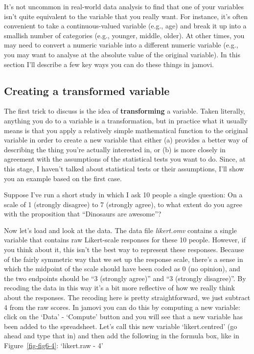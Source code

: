 \documentclass[
  a4paper,
]{book}
\begin{document}
It's not uncommon in real-world data analysis to find that one of your
variables isn't quite equivalent to the variable that you really want.
For instance, it's often convenient to take a continuous-valued variable
(e.g., age) and break it up into a smallish number of categories (e.g.,
younger, middle, older). At other times, you may need to convert a
numeric variable into a different numeric variable (e.g., you may want
to analyse at the absolute value of the original variable). In this
section I'll describe a few key ways you can do these things in jamovi.

\hypertarget{creating-a-transformed-variable}{%
\subsection{Creating a transformed
variable}\label{creating-a-transformed-variable}}

The first trick to discuss is the idea of \textbf{transforming} a
variable. Taken literally, anything you do to a variable is a
transformation, but in practice what it usually means is that you apply
a relatively simple mathematical function to the original variable in
order to create a new variable that either (a) provides a better way of
describing the thing you're actually interested in, or (b) is more
closely in agreement with the assumptions of the statistical tests you
want to do. Since, at this stage, I haven't talked about statistical
tests or their assumptions, I'll show you an example based on the first
case.

Suppose I've run a short study in which I ask 10 people a single
question: On a scale of 1 (strongly disagree) to 7 (strongly agree), to
what extent do you agree with the proposition that ``Dinosaurs are
awesome''?

Now let's load and look at the data. The data file \emph{likert.omv}
contains a single variable that contains raw Likert-scale responses for
these 10 people. However, if you think about it, this isn't the best way
to represent these responses. Because of the fairly symmetric way that
we set up the response scale, there's a sense in which the midpoint of
the scale should have been coded as 0 (no opinion), and the two
endpoints should be ``3 (strongly agree)'' and ``3 (strongly
disagree)''. By recoding the data in this way it's a bit more reflective
of how we really think about the responses. The recoding here is pretty
straightforward, we just subtract 4 from the raw scores. In jamovi you
can do this by computing a new variable: click on the `Data' - `Compute'
button and you will see that a new variable has been added to the
spreadsheet. Let's call this new variable `likert.centred' (go ahead and
type that in) and then add the following in the formula box, like in
Figure~\ref{fig-fig6-4}: `likert.raw - 4'
\end{document}
